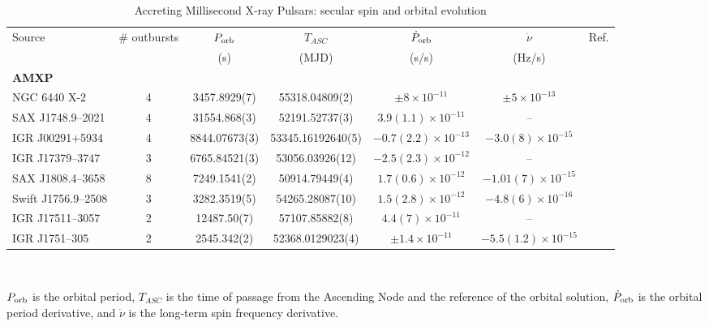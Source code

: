 \documentclass[graybox]{svmult}
\begin{document}
\begin{table}
\caption{Accreting Millisecond X-ray Pulsars: secular spin and orbital evolution}
\scriptsize
\begin{center}
\begin{tabular}{lcccccl}
\hline
\hline
Source & \# outbursts & $P_{\rm orb}$ & $T_{ASC}$  & $\dot{P}_{\rm orb}$ & $\dot{\nu}$ & Ref.\\
 &  & (s) & (MJD) & (s/s) & (Hz/s) &\\
\hline
\textbf{AMXP} & & & & & & \\
\hline
NGC 6440 X-2 & 4 & 3457.8929(7) & 55318.04809(2) &  $\pm8\times 10^{-11}$ &$\pm5\times 10^{-13}$ & \cite{Bult2015c}\\
SAX J1748.9--2021 & 4 & 31554.868(3) & 52191.52737(3) &  $3.9(1.1)\times 10^{-11}$ & --& \cite{Sanna2020}\\
IGR J00291+5934  & 4 & 8844.07673(3) &53345.16192640(5)  & $-0.7(2.2)\times 10^{-13}$ & $-3.0(8)\times 10^{-15} $  &  \cite{Patruno2017,Sanna2017d,Patruno2010,Papitto2011c}\\
IGR J17379--3747  & 3 & 6765.84521(3) & 53056.03926(12) &  $−2.5(2.3)\times 10^{-12}$ & --  & \cite{Sanna2018b}\\
SAX J1808.4--3658 & 8 & 7249.1541(2) & 50914.79449(4) & $1.7(0.6)\times 10^{-12}$ & $-1.01(7)\times 10^{-15}$ & \cite{Bult2019c,Sanna2020b}\\
Swift J1756.9--2508 &3  & 3282.3519(5) &  54265.28087(10) &  $1.5(2.8)\times 10^{-12}$ & $-4.8(6)\times 10^{-16}$ & \cite{Sanna2018d,Bult2018b}\\
IGR J17511--3057 & 2 & 12487.50(7) & 57107.85882(8) & $4.4(7)\times10^{-11}$  & -- &  \cite{Riggio2020} \\
IGR J1751--305 & 2 & 2545.342(2) & 52368.0129023(4) & $\pm1.4\times10^{-11}$  & $-5.5(1.2)\times 10^{-15}$ &  \cite{Riggio2011b}\\
\hline
\hline
\end{tabular}\\
\end{center}
$P_{\rm orb}$ is the orbital period, $T_{ASC}$ is the time of passage from the Ascending Node and the reference of the orbital solution, $\dot{P}_{\rm orb}$ is the orbital period derivative, and $\dot \nu$ is the long-term spin frequency derivative.
\label{Tab2}
\end{table}
\end{document}
